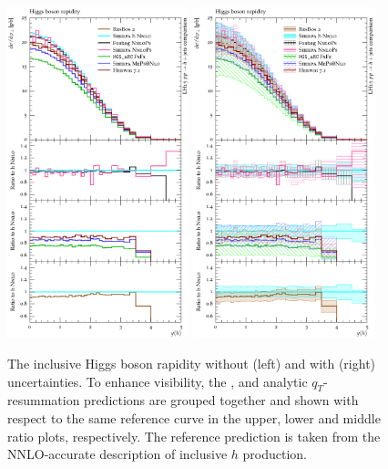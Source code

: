 \begin{figure}[t!]
  \centering
  \includegraphics[width=0.47\textwidth]{figures/hjetscomp_u_H_y.pdf}
  \hfill
  \includegraphics[width=0.47\textwidth]{figures/hjetscomp_H_y.pdf}
  \caption{\label{fig:hjetscomp:results:inclobs:hy}%
    The inclusive Higgs boson rapidity without (left) and with (right)
    uncertainties. To enhance visibility, the \NNLOPS, \MEPSatNLO and
    analytic $q_T$-resummation predictions are grouped together and
    shown with respect to the same reference curve in the upper, lower
    and middle ratio plots, respectively. The reference prediction is
    taken from the NNLO-accurate description of inclusive $h$ production.}
\end{figure}

